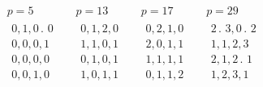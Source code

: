 \[
\begin{array}{c|c|c|c}
\begin{gathered}
p=5\\[3pt]
\begin{array}{l}
0,1,0\mathpunct{.}\,0\\
0,0,0,1\\
0,0,0,0\\
0,0,1,0
\end{array}
\end{gathered}&
\begin{gathered}
p=13\\[3pt]
\begin{array}{l}
0,1,2,0\\
1,1,0,1\\
0,1,0,1\\
1,0,1,1
\end{array}
\end{gathered}&
\begin{gathered}
p=17\\[3pt]
\begin{array}{l}
0,2,1,0\\
2,0,1,1\\
1,1,1,1\\
0,1,1,2
\end{array}
\end{gathered}&
\begin{gathered}
p=29\\[3pt]
\begin{array}{l}
2\mathpunct{.}\,3,0\mathpunct{.}\,2\\
1,1,2,3\\
2,1,2\mathpunct{.}\,1\\
1,2,3,1
\end{array}
\end{gathered}
\end{array}
\]

